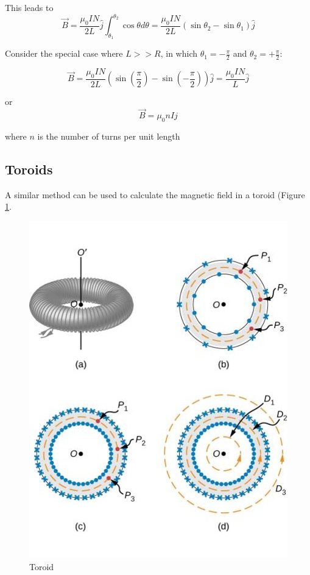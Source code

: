 \documentclass[14pt]{memoir}
\begin{document}
This leads to 
\begin{equation}
\vec{B} = \frac{\mu_0 I N}{2L} \hat{j} \int_{\theta_1}^{\theta_2} \cos{\theta} d\theta = \frac{\mu_0 I N}{2L} (\sin{\theta_2} - \sin{\theta_1}) \hat{j}
\end{equation}

Consider the special case where $L >> R$, in which $\theta_1 = - \frac{\pi}{2}$ and $\theta_2 = + \frac{\pi}{2}$:

\begin{equation}
\vec{B} =  \frac{\mu_0 I N}{2L} (\sin{(\frac{\pi}{2})} - \sin{(- \frac{\pi}{2})}) \hat{j} = \frac{\mu_0 I N}{L} \hat{j}
\end{equation}

or 
\begin{equation}
\vec{B}  = \mu_0 n I \hat{j}
\end{equation}

where $n$ is the number of turns per unit length

\subsection{Toroids}

A similar method can be used to calculate the magnetic field in a toroid (Figure \ref{fig:12_22}.

\begin{figure}[H]
\begin{center}
\includegraphics[scale=0.5]{fig/fig_12_22.jpg}
\caption{Toroid}
\label{fig:12_22}
\end{center}
\end{figure}
\end{document}
